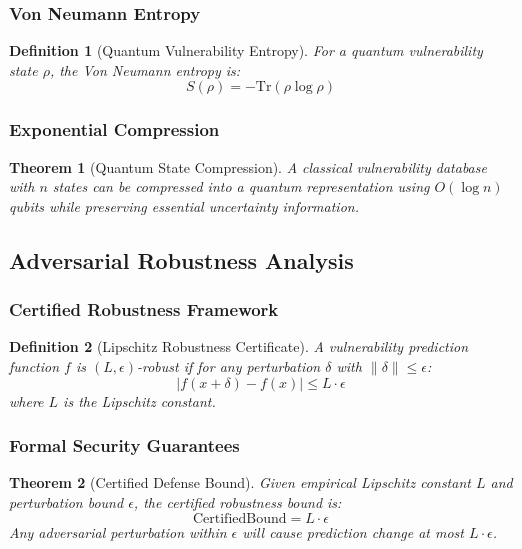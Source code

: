 \documentclass[journal]{IEEEtran}
\newtheorem{theorem}{Theorem}
\newtheorem{definition}{Definition}
\begin{document}
\subsubsection{Von Neumann Entropy}

\begin{definition}[Quantum Vulnerability Entropy]
For a quantum vulnerability state $\rho$, the Von Neumann entropy is:
$$S(\rho) = -\text{Tr}(\rho \log \rho)$$
\end{definition}

\subsubsection{Exponential Compression}

\begin{theorem}[Quantum State Compression]
A classical vulnerability database with $n$ states can be compressed into a quantum representation using $O(\log n)$ qubits while preserving essential uncertainty information.
\end{theorem}

\subsection{Adversarial Robustness Analysis}

\subsubsection{Certified Robustness Framework}

\begin{definition}[Lipschitz Robustness Certificate]
A vulnerability prediction function $f$ is $(L, \epsilon)$-robust if for any perturbation $\delta$ with $\|\delta\| \leq \epsilon$:
$$|f(x + \delta) - f(x)| \leq L \cdot \epsilon$$
where $L$ is the Lipschitz constant.
\end{definition}

\subsubsection{Formal Security Guarantees}

\begin{theorem}[Certified Defense Bound]
Given empirical Lipschitz constant $L$ and perturbation bound $\epsilon$, the certified robustness bound is:
$$\text{CertifiedBound} = L \cdot \epsilon$$
Any adversarial perturbation within $\epsilon$ will cause prediction change at most $L \cdot \epsilon$.
\end{theorem}
\end{document}
